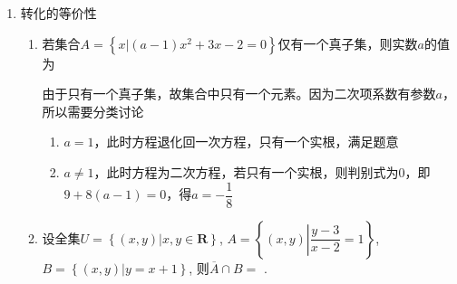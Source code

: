 \begin{enumerate}
\begin{enumerate}
\begin{jieda}
            由${\mathbf{a}}_{\mathbf{i}} \in  \mathbf{Z}(i = 1,2,3,4)$可知$a_2^2 \geq 0, a_3^2 \geq 1, a_4^2 \geq 4$，因此必有$a_4^2 > a_4$，故$\left\{\begin{array}{l}
                 a_2^2 = a_2 \\
                 a_3^2 = a_3
            \end{array}\right.$，即$\left\{\begin{array}{l}
                 a_2 = 0 \\
                 a_3 = 1
            \end{array}\right.$，故$A \cup  B = \left\{-1, 0, 1, a_4, a_4^2\right\}$，故$a_4 = 7$，因此$a_3+a_4 = 8$
        \end{jieda}
        \item 设集合$A=\left\{1, 2, m\right\}$，其中$m$为实数，令$B=\left\{a^2|a \in A\right\}$， $C = A \cup B$。若$C$中所有元素之和为6，则$C$中所有元素之积为
        \begin{jieda}
            $B = \left\{1, 4, m^2\right\}$，则$1, 2, 4, m, m^2 \in C$。根据$C$中元素和为6，而$1+2+4 > 6$，又因为$m^2+m > -1$恒成立，故应有$m < 0$ 且 $m^2 \in \left\{1, 2, 4\right\}$。故可知$m = -1$, $C = \left\{1, 2, 4, -1\right\}$，因此$C$中所有元素之积为-8.
        \end{jieda}
    \end{enumerate}
    \item 转化的等价性
    \begin{enumerate}
        \item 若集合$A = \left\{x | (a-1)x^2+3x-2 = 0\right\}$仅有一个真子集，则实数$a$的值为
        \begin{jieda}
            由于只有一个真子集，故集合中只有一个元素。因为二次项系数有参数$a$，所以需要分类讨论
            \begin{enumerate}
                \item $a = 1$，此时方程退化回一次方程，只有一个实根，满足题意  
                \item $a \neq 1$，此时方程为二次方程，若只有一个实根，则判别式为0，即$9 + 8(a-1) = 0$，得$a = -\dfrac{1}{8}$
            \end{enumerate}
        \end{jieda}
        \item 设全集$U = \left\{(x, y) | x, y \in \mathbf{R}\right\}$, $A = \left\{(x, y) \left| \dfrac{y-3}{x-2}=1\right. \right\}$, $B = \left\{(x, y) | y=x+1\right\}$, 则$\overline{A}\cap B = $ .

\end{enumerate}
\end{enumerate}

